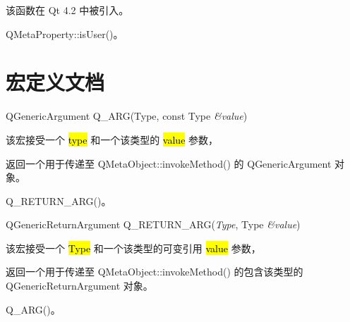 该函数在 Qt 4.2 中被引入。

\begin{seeAlso}
QMetaProperty::isUser()。
\end{seeAlso}

\section{宏定义文档}

QGenericArgument Q\_ARG(Type, const Type \emph{\&value})

该宏接受一个 \hl{type} 和一个该类型的 \hl{value} 参数，

返回一个用于传递至 QMetaObject::invokeMethod() 的 QGenericArgument 对象。

\begin{seeAlso}
Q\_RETURN\_ARG()。
\end{seeAlso} 

QGenericReturnArgument Q\_RETURN\_ARG(\emph{Type}, Type \emph{\&value})

该宏接受一个 \hl{Type} 和一个该类型的可变引用 \hl{value} 参数，

返回一个用于传递至 QMetaObject::invokeMethod() 的包含该类型的 QGenericReturnArgument 对象。

\begin{seeAlso}
Q\_ARG()。
\end{seeAlso} 